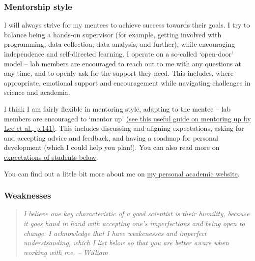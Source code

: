 \documentclass[
]{book}
\begin{document}
\hypertarget{mentorship-style}{%
\subsubsection*{Mentorship style}\label{mentorship-style}}

I will always strive for my mentees to achieve success towards their goals. I try to balance being a hands-on supervisor (for example, getting involved with programming, data collection, data analysis, and further), while encouraging independence and self-directed learning. I operate on a so-called `open-door' model -- lab members are encouraged to reach out to me with any questions at any time, and to openly ask for the support they need. This includes, where appropriate, emotional support and encouragement while navigating challenges in science and academia.

I think I am fairly flexible in mentoring style, adapting to the mentee -- lab members are encouraged to `mentor up' \href{https://graduateschool.syr.edu/wp-content/uploads/2017/03/Lee-et-al..pdf}{(see this useful guide on mentoring up by Lee et al., p.141)}. This includes discussing and aligning expectations, asking for and accepting advice and feedback, and having a roadmap for personal development (which I could help you plan!). You can also read more on \protect\hyperlink{student-expectations}{expectations of students below}.

You can find out a little bit more about me on \href{https://williamngiam.github.io}{my personal academic website}.

\hypertarget{weaknesses}{%
\subsubsection*{Weaknesses}\label{weaknesses}}

\begin{quote}
\emph{I believe one key characteristic of a good scientist is their humility, because it goes hand in hand with accepting one's imperfections and being open to change. I acknowledge that I have weakenesses and imperfect understsanding, which I list below so that you are better aware when working with me. -- William}
\end{quote}
\end{document}
